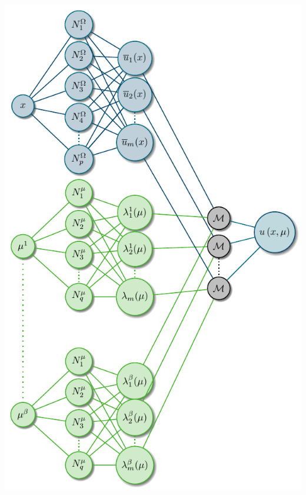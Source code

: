 \documentclass[aspectratio=1610]{beamer}
\begin{document}
\begin{frame}
\begin{minipage}{0.38\linewidth}
			\includegraphics[width=\linewidth]{Schema/HiDeNN-TD-SpatialParam.pdf}
		\end{minipage}
	\end{frame}
	

	
\end{document}

